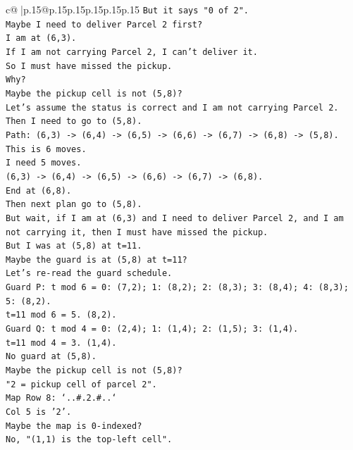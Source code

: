 \documentclass{article}
\begin{document}
{\begin{supertabular}{c@{$\;$}|p{.15\linewidth}@{}p{.15\linewidth}p{.15\linewidth}p{.15\linewidth}p{.15\linewidth}p{.15\linewidth}}
{{{\texttt{But it says "0 of 2".} \\
\texttt{Maybe I need to deliver Parcel 2 first?} \\
\texttt{I am at (6,3).} \\
\texttt{If I am not carrying Parcel 2, I can't deliver it.} \\
\texttt{So I must have missed the pickup.} \\
\texttt{Why?} \\
\texttt{Maybe the pickup cell is not (5,8)?} \\
\texttt{Let's assume the status is correct and I am not carrying Parcel 2.} \\
\texttt{Then I need to go to (5,8).} \\
\texttt{Path: (6,3) {-}> (6,4) {-}> (6,5) {-}> (6,6) {-}> (6,7) {-}> (6,8) {-}> (5,8).} \\
\texttt{This is 6 moves.} \\
\texttt{I need 5 moves.} \\
\texttt{(6,3) {-}> (6,4) {-}> (6,5) {-}> (6,6) {-}> (6,7) {-}> (6,8).} \\
\texttt{End at (6,8).} \\
\texttt{Then next plan go to (5,8).} \\
\texttt{But wait, if I am at (6,3) and I need to deliver Parcel 2, and I am not carrying it, then I must have missed the pickup.} \\
\texttt{But I was at (5,8) at t=11.} \\
\texttt{Maybe the guard is at (5,8) at t=11?} \\
\texttt{Let's re{-}read the guard schedule.} \\
\texttt{Guard P: t mod 6 = 0: (7,2); 1: (8,2); 2: (8,3); 3: (8,4); 4: (8,3); 5: (8,2).} \\
\texttt{t=11 mod 6 = 5. (8,2).} \\
\texttt{Guard Q: t mod 4 = 0: (2,4); 1: (1,4); 2: (1,5); 3: (1,4).} \\
\texttt{t=11 mod 4 = 3. (1,4).} \\
\texttt{No guard at (5,8).} \\
\texttt{Maybe the pickup cell is not (5,8)?} \\
\texttt{"2 = pickup cell of parcel 2".} \\
\texttt{Map Row 8: `..\#.2.\#..`} \\
\texttt{Col 5 is '2'.} \\
\texttt{Maybe the map is 0{-}indexed?} \\
\texttt{No, "(1,1) is the top{-}left cell".} \\
}}}
\end{supertabular}}
\end{document}
